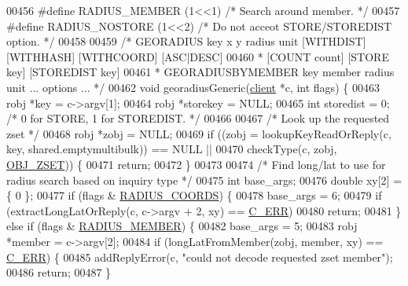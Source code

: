 \begin{DoxyCode}
{{{{{{{{{00456 \textcolor{preprocessor}{#}\textcolor{preprocessor}{define} \textcolor{preprocessor}{RADIUS\_MEMBER} \textcolor{preprocessor}{(}1\textcolor{preprocessor}{<<}1\textcolor{preprocessor}{)}    \textcolor{comment}{/* Search around member. */}
00457 \textcolor{preprocessor}{#}\textcolor{preprocessor}{define} \textcolor{preprocessor}{RADIUS\_NOSTORE} \textcolor{preprocessor}{(}1\textcolor{preprocessor}{<<}2\textcolor{preprocessor}{)}   \textcolor{comment}{/* Do not acceot STORE/STOREDIST option. */}
00458 
00459 \textcolor{comment}{/* GEORADIUS key x y radius unit [WITHDIST] [WITHHASH] [WITHCOORD] [ASC|DESC]}
00460 \textcolor{comment}{ *                               [COUNT count] [STORE key] [STOREDIST key]}
00461 \textcolor{comment}{ * GEORADIUSBYMEMBER key member radius unit ... options ... */}
00462 \textcolor{keywordtype}{void} georadiusGeneric(\hyperlink{structclient}{client} *c, \textcolor{keywordtype}{int} flags) \{
00463     robj *key = c->argv[1];
00464     robj *storekey = NULL;
00465     \textcolor{keywordtype}{int} storedist = 0; \textcolor{comment}{/* 0 for STORE, 1 for STOREDIST. */}
00466 
00467     \textcolor{comment}{/* Look up the requested zset */}
00468     robj *zobj = NULL;
00469     \textcolor{keywordflow}{if} ((zobj = lookupKeyReadOrReply(c, key, shared.emptymultibulk)) == NULL ||
00470         checkType(c, zobj, \hyperlink{server_8h_a8c356422ddbc03bd77694880a30a1953}{OBJ\_ZSET})) \{
00471         \textcolor{keywordflow}{return};
00472     \}
00473 
00474     \textcolor{comment}{/* Find long/lat to use for radius search based on inquiry type */}
00475     \textcolor{keywordtype}{int} base\_args;
00476     \textcolor{keywordtype}{double} xy[2] = \{ 0 \};
00477     \textcolor{keywordflow}{if} (flags & \hyperlink{geo_8c_a81d5eea6d1e3b777aa5fb123bc0e02a0}{RADIUS\_COORDS}) \{
00478         base\_args = 6;
00479         \textcolor{keywordflow}{if} (extractLongLatOrReply(c, c->argv + 2, xy) == \hyperlink{server_8h_af98ac28d5f4d23d7ed5985188e6fb7d1}{C\_ERR})
00480             \textcolor{keywordflow}{return};
00481     \} \textcolor{keywordflow}{else} \textcolor{keywordflow}{if} (flags & \hyperlink{geo_8c_ac9a2d1a380b6e56d2c1dabe19085a9ba}{RADIUS\_MEMBER}) \{
00482         base\_args = 5;
00483         robj *member = c->argv[2];
00484         \textcolor{keywordflow}{if} (longLatFromMember(zobj, member, xy) == \hyperlink{server_8h_af98ac28d5f4d23d7ed5985188e6fb7d1}{C\_ERR}) \{
00485             addReplyError(c, \textcolor{stringliteral}{"could not decode requested zset member"});
00486             \textcolor{keywordflow}{return};
00487         \}
}}}}}}}}}
\end{DoxyCode}
